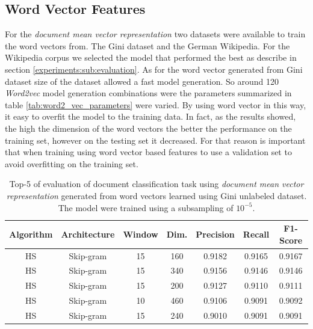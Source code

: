 \subsection{Word Vector Features}

For the \textit{document mean vector representation} two datasets were available to
train the word vectors from. The Gini dataset and the German Wikipedia.
 For the Wikipedia corpus we selected the model that
performed the best as describe in section \ref{experiments:sub:evaluation}. 
As for the word vector generated from Gini dataset 
size of the dataset  allowed a fast model generation. So around 120
\textit{Word2vec} model generation  combinations were the parameters
summarized in table \ref{tab:word2_vec_parameters} were varied. By using word
vector in this way, it easy to overfit the model to the training data. In
fact, as the results showed, the high the dimension of the word vectors the
better the performance on the training set, however on the testing set it
decreased.  For that reason is important that when training using word vector
based features to use a validation set to avoid overfitting on the training
set. 

\begin{table}[!htpb]

  \centering
  \caption{Top-5 of evaluation of document classification task using
    \textit{document mean vector representation} generated from word vectors learned
  using Gini unlabeled dataset. The model were trained using a subsampling of
  $10^{-5}$.}
  \label{tab:w2v4tc_gini_w2v_evaluation}

\small
\begin{tabular}{|c|c|c|c|c|c|c|}
\hline
 Algorithm  &  Architecture  &  Window  &  Dim.  &  Precision  &    Recall  &  F1-Score  \\
\hline
\ac{HS}    &  Skip-gram     &      15  &   160  &   0.9182 &  0.9165  &  0.9167  \\
\ac{HS}    &  Skip-gram     &      15  &   340  &   0.9156  &  0.9146  &  0.9146  \\
\ac{HS}    &  Skip-gram     &      15  &   200  &   0.9127  &  0.9110  &  0.9111  \\
\ac{HS}    &  Skip-gram     &      10  &   460  &   0.9106  &  0.9091  &  0.9092  \\
\ac{HS}    &  Skip-gram     &      15  &   240  &   0.9010  &  0.9091  & 0.9091  \\
\hline
\end{tabular}
\end{table}



